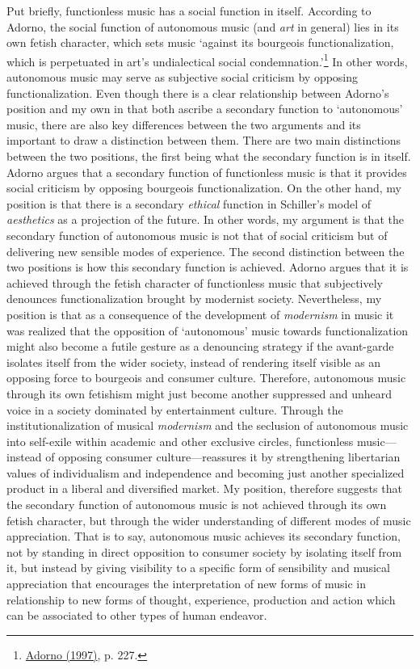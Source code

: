 Put briefly, functionless music has a social function in itself. According to Adorno, the social function of autonomous music (and \emph{art} in general) lies in its own fetish character, which sets music `against its bourgeois functionalization, which is perpetuated in art's undialectical social condemnation.'\footnote{\hyperlink{adornoaesth}{Adorno (1997)}, p. 227.} In other words, autonomous music may serve as subjective social criticism by opposing functionalization. Even though there is a clear relationship between Adorno's position and my own in that both ascribe a secondary function to `autonomous' music, there are also key differences between the two arguments and its important to draw a distinction between them. There are two main distinctions between the two positions, the first being what the secondary function is in itself. Adorno argues that a secondary function of functionless music is that it provides social criticism by opposing bourgeois functionalization. On the other hand, my position is that there is a secondary \emph{ethical} function in Schiller's model of \emph{aesthetics} as a projection of the future. In other words, my argument is that the secondary function of autonomous music is not that of social criticism but of delivering new sensible modes of experience. The second distinction between the two positions is how this secondary function is achieved. Adorno argues that it is achieved through the fetish character of functionless music that subjectively denounces functionalization brought by modernist society. Nevertheless, my position is that as a consequence of the development of \emph{modernism} in music it was realized that the opposition of `autonomous' music towards functionalization might also become a futile gesture as a denouncing strategy if the avant-garde isolates itself from the wider society, instead of rendering itself visible as an opposing force to bourgeois and consumer culture. Therefore, autonomous music through its own fetishism might just become another suppressed and unheard voice in a society dominated by entertainment culture. Through the institutionalization of musical \emph{modernism} and the seclusion of autonomous music into self-exile within academic and other exclusive circles, functionless music---instead of opposing consumer culture---reassures it by strengthening libertarian values of individualism and independence and becoming just another specialized product in a liberal and diversified market. My position, therefore suggests that the secondary function of autonomous music is not achieved through its own fetish character, but through the wider understanding of different modes of music appreciation. That is to say, autonomous music achieves its secondary function, not by standing in direct opposition to consumer society by isolating itself from it, but instead by giving visibility to a specific form of sensibility and musical appreciation that encourages the interpretation of new forms of music in relationship to new forms of thought, experience, production and action which can be associated to other types of human endeavor.

